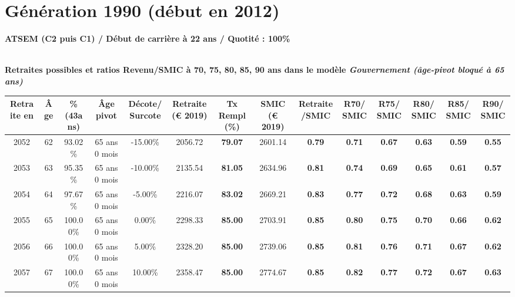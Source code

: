 \newpage 
 
\section{Génération 1990 (début en 2012)\label{ATSEM_100_1990_22_0}} 
 
{\bf \noindent ATSEM (C2 puis C1) / Début de carrière à 22 ans / Quotité : 100\%}  ~ 

 ~\\{\bf \noindent Retraites possibles et ratios Revenu/SMIC à 70, 75, 80, 85, 90 ans dans le modèle \emph{Gouvernement (âge-pivot bloqué à 65 ans)}}  
 
\begin{adjustbox}{max width=\textwidth} 
\begin{tabular}[htb]{|c|c||c|c|c||c|c||c|c||c|c|c|c|c|} 
\hline 
 Retraite en &  Âge &  \%(43ans) &  Âge pivot &  Décote/Surcote &  Retraite (\euro{} 2019) &  Tx Rempl(\%) &  SMIC (\euro{} 2019) &  Retraite/SMIC &  R70/SMIC &  R75/SMIC &  R80/SMIC &  R85/SMIC &  R90/SMIC \\ 
\hline \hline 
 2052 &  62 &  93.02\% &  65 ans 0 mois &  -15.00\% &  2056.72 &  {\bf 79.07} &  2601.14 &  {\bf {\color{red} 0.79}} &  {\bf {\color{red} 0.71}} &  {\bf {\color{red} 0.67}} &  {\bf {\color{red} 0.63}} &  {\bf {\color{red} 0.59}} &  {\bf {\color{red} 0.55}} \\ 
\hline 
 2053 &  63 &  95.35\% &  65 ans 0 mois &  -10.00\% &  2135.54 &  {\bf 81.05} &  2634.96 &  {\bf {\color{red} 0.81}} &  {\bf {\color{red} 0.74}} &  {\bf {\color{red} 0.69}} &  {\bf {\color{red} 0.65}} &  {\bf {\color{red} 0.61}} &  {\bf {\color{red} 0.57}} \\ 
\hline 
 2054 &  64 &  97.67\% &  65 ans 0 mois &  -5.00\% &  2216.07 &  {\bf 83.02} &  2669.21 &  {\bf {\color{red} 0.83}} &  {\bf {\color{red} 0.77}} &  {\bf {\color{red} 0.72}} &  {\bf {\color{red} 0.68}} &  {\bf {\color{red} 0.63}} &  {\bf {\color{red} 0.59}} \\ 
\hline 
 2055 &  65 &  100.00\% &  65 ans 0 mois &  0.00\% &  2298.33 &  {\bf 85.00} &  2703.91 &  {\bf {\color{red} 0.85}} &  {\bf {\color{red} 0.80}} &  {\bf {\color{red} 0.75}} &  {\bf {\color{red} 0.70}} &  {\bf {\color{red} 0.66}} &  {\bf {\color{red} 0.62}} \\ 
\hline 
 2056 &  66 &  100.00\% &  65 ans 0 mois &  5.00\% &  2328.20 &  {\bf 85.00} &  2739.06 &  {\bf {\color{red} 0.85}} &  {\bf {\color{red} 0.81}} &  {\bf {\color{red} 0.76}} &  {\bf {\color{red} 0.71}} &  {\bf {\color{red} 0.67}} &  {\bf {\color{red} 0.62}} \\ 
\hline 
 2057 &  67 &  100.00\% &  65 ans 0 mois &  10.00\% &  2358.47 &  {\bf 85.00} &  2774.67 &  {\bf {\color{red} 0.85}} &  {\bf {\color{red} 0.82}} &  {\bf {\color{red} 0.77}} &  {\bf {\color{red} 0.72}} &  {\bf {\color{red} 0.67}} &  {\bf {\color{red} 0.63}} \\ 
\hline 
\hline 
\end{tabular} 
\end{adjustbox} 
 
